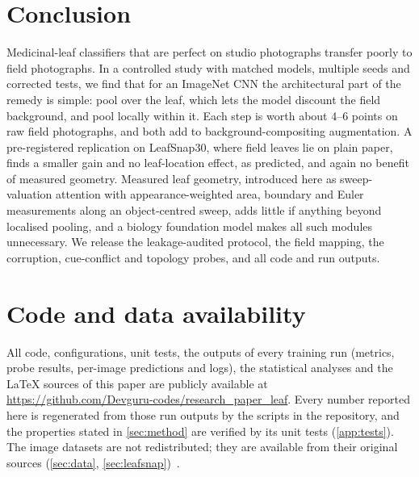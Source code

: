 \section{Conclusion}
\label{sec:conclusion}
Medicinal-leaf classifiers that are perfect on studio photographs transfer poorly to field
photographs. In a controlled study with matched models, multiple seeds and corrected tests, we find
that for an ImageNet CNN the architectural part of the remedy is simple: pool over the leaf, which
lets the model discount the field background, and pool locally within it. Each step is worth about
4--6 points on raw field photographs, and both add to background-compositing augmentation.
A pre-registered replication on LeafSnap30, where field leaves lie on plain paper, finds a smaller
gain and no leaf-location effect, as predicted, and again no benefit of measured geometry. Measured
leaf geometry, introduced here as sweep-valuation attention with appearance-weighted area, boundary
and Euler measurements along an object-centred sweep, adds little if anything beyond localised
pooling, and a biology foundation model makes all such modules unnecessary. We release the
leakage-audited protocol, the field mapping, the corruption, cue-conflict and topology probes, and
all code and run outputs.
\section*{Code and data availability}
All code, configurations, unit tests, the outputs of every training run (metrics, probe results,
per-image predictions and logs), the statistical analyses and the \LaTeX{} sources of this paper are
publicly available at \url{https://github.com/Devguru-codes/research_paper_leaf}. Every number
reported here is regenerated from those run outputs by the scripts in the repository, and the
properties stated in \cref{sec:method} are verified by its unit tests (\cref{app:tests}). The image
datasets are not redistributed; they are available from their original sources
(\cref{sec:data}, \cref{sec:leafsnap})~\citep{roopashree2020dataset,pushpa2023dimpsar,leafsnap30}.
